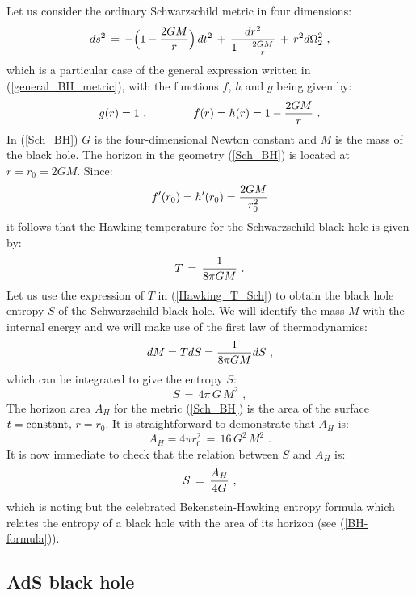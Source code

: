 \documentclass[12pt,notitlepage,a4paper]{article}
\newcommand{\beq}{\begin{equation}}
\newcommand{\eeq}{\end{equation}}
\begin{document}
Let us consider the  ordinary Schwarzschild  metric in four dimensions:
\beq
ds^2\,=\,-\Big(1-{2GM\over r}\Big)\,dt^2\,+\,{dr^2\over 1-{2GM\over r}}\,+\,
r^2 d\Omega_2^2\,\,,
\label{Sch_BH}
\eeq
which is a particular case  of the general  expression written in (\ref{general_BH_metric}),  with the functions $f$, $h$ and $g$ being given by:
\beq
g(r)=1\,\,,
\qquad\qquad
f(r)=h(r)=1-{2GM\over r}\,\,.
\eeq
In (\ref{Sch_BH}) $G$ is the four-dimensional Newton constant and $M$ is the mass of the black hole. The horizon in the geometry (\ref{Sch_BH}) is located at $r=r_0=2 GM$. Since:
\beq
f'(r_0)=h'(r_0)={2GM\over r_0^2}
\eeq
it follows that the Hawking temperature for the  Schwarzschild black hole is given by:
\beq
T\,=\,{1\over 8\pi G M}\,\,.
\label{Hawking_T_Sch}
\eeq
Let us use the expression of $T$  in (\ref{Hawking_T_Sch}) to obtain the black hole entropy $S$ of the Schwarzschild black hole. We will identify the mass $M$ with the internal energy and we  will make use of the first law of thermodynamics:
\beq
dM=T dS={1\over  8\pi G M} dS\,\,,
\eeq
which can be integrated to give  the entropy $S$:
\beq
S\,=\,4\pi\,G\,M^2\,\,,
\eeq
The horizon area $A_H$  for the metric (\ref{Sch_BH}) is the area of the surface $t={\rm constant}$, $r=r_0$. It is straightforward to demonstrate that $A_H$ is:
\beq
A_H=4\pi r_0^2\,=\,16\,G^2\,M^2\,\,.
\eeq
It is now immediate to check that the relation between $S$ and $A_H$ is:
\beq
S\,=\,{A_H\over 4 G}\,\,,
\eeq
which is noting but the celebrated Bekenstein-Hawking entropy formula which relates the entropy of a black hole with the area of its horizon (see (\ref{BH-formula})). 

\subsection {AdS black hole}
\label{section_AdS_BH}
\end{document}
